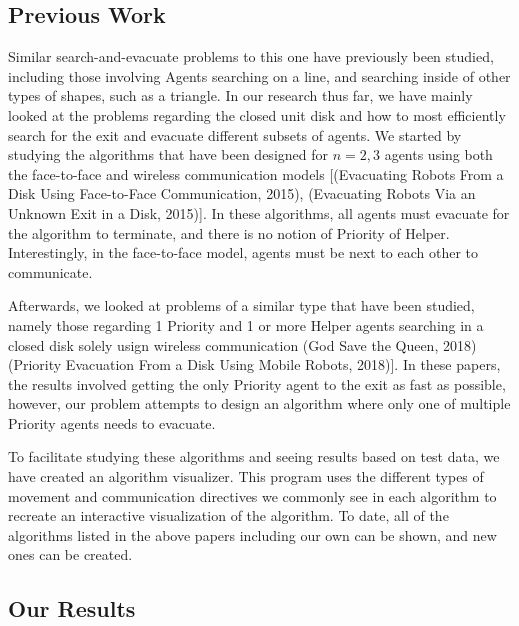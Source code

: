 \documentclass[11pt]{article}
\begin{document}
\subsection{Previous Work}

\begin{flushleft}
Similar search-and-evacuate problems to this one have previously been studied, including those involving Agents
searching on a line, and searching inside of other types of shapes, such as a triangle.
In our research thus far, we have mainly looked at the problems regarding
the closed unit disk and how to most efficiently search for the exit and evacuate
different subsets of agents. We started by studying the algorithms that have been designed
for $n = 2, 3$ agents using both the face-to-face and wireless communication models [(Evacuating Robots
From a Disk Using Face-to-Face Communication, 2015), (Evacuating Robots Via an Unknown Exit in a Disk, 2015)].
In these algorithms, all agents must evacuate for the algorithm to terminate, and there is no notion of
Priority of Helper. Interestingly, in the face-to-face model, agents must be next to each other to
communicate.

\vspace*{5mm} \hspace{\parindent} Afterwards, we looked at problems of a similar type that have been studied,
namely those regarding 1 Priority and 1 or more Helper agents searching in a
closed disk solely usign wireless communication (God Save the Queen, 2018)
(Priority Evacuation From a Disk Using Mobile Robots, 2018)].
In these papers, the results involved getting the only Priority agent to the exit
as fast as possible, however, our problem attempts to design an algorithm where
only one of multiple Priority agents needs to evacuate.

\vspace*{5mm} \hspace{\parindent} To facilitate studying these algorithms and seeing results based on test data, we
have created an algorithm visualizer. This program uses the different types of movement and
communication directives we commonly see in each algorithm to recreate an
interactive visualization of the algorithm. To date, all of the algorithms
listed in the above papers including our own can be shown, and new ones can be created.
\end{flushleft}


\subsection{Our Results}
\end{document}
